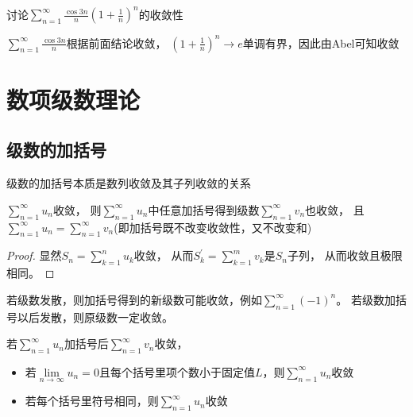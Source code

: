 ~

\begin{exercise}[具体例子]
  讨论$\sum\limits_{n = 1}^{\infty} \frac{\cos 3n}{n} (1 + \frac{1}{n})^n$的收敛性
\end{exercise}

\begin{solution}
  $\sum\limits_{n = 1}^{\infty} \frac{\cos 3n}{n}$根据前面结论收敛，
  $(1 + \frac{1}{n})^n \rightarrow e$单调有界，因此由Abel可知收敛
\end{solution}

\section{数项级数理论}


\subsection{级数的加括号}

级数的加括号本质是数列收敛及其子列收敛的关系

\begin{theorem}[加括号收敛]
  $\sum\limits_{n = 1}^{\infty}u_n$收敛，
  则$\sum\limits_{n = 1}^{\infty}u_n$中任意加括号得到级数$\sum\limits_{n = 1}^{\infty} v_n$也收敛，
  且$\sum\limits_{n = 1}^{\infty}u_n = \sum\limits_{n = 1}^{\infty}v_n$(即加括号既不改变收敛性，又不改变和)
\end{theorem}

\begin{proof}
  显然$S_n = \sum\limits_{k = 1}^n u_k$收敛，
  从而$S_k^{\prime} = \sum\limits_{k = 1}^mv_k$是$S_n$子列，
  从而收敛且极限相同。
\end{proof}

\begin{note}
  若级数发散，则加括号得到的新级数可能收敛，例如$\sum\limits_{n = 1}^{\infty}(-1)^n$。
  若级数加括号以后发散，则原级数一定收敛。
\end{note}

\begin{theorem}[加括号收敛反推级数收敛]
  若$\sum\limits_{n = 1}^{\infty}u_n$加括号后$\sum\limits_{n = 1}^{\infty}v_n$收敛，
  \begin{itemize}
  \item 若$\lim \limits _{n \rightarrow \infty} u_n = 0$且每个括号里项个数小于固定值$L$，则$\sum\limits_{n = 1}^{\infty}u_n$收敛
  \item 若每个括号里符号相同，则$\sum\limits_{n = 1}^{\infty}u_n$收敛
  \end{itemize}
\end{theorem}



